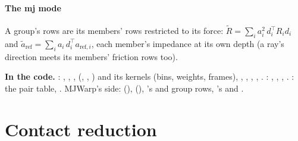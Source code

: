 \paragraph{The mj mode} A group's rows are its members' rows restricted to its force: $\tilde R = \sum_i a_i^2\, d_i^\top R_i d_i$ and $\tilde a_{\text{ref}} = \sum_i a_i\, d_i^\top a_{\text{ref},i}$, each member's impedance at its own depth (a ray's direction meets its members' friction rows too).

\begin{codebox}
\textbf{In the code.} : , , ,  (, , ) and its kernels  (bins, weights, frames), , , , , . : , , , . : the pair table, . MJWarp's side:  (),  (), 's  and group rows, 's  and .
\end{codebox}

\section{Contact reduction}\label{sec:reduce}

